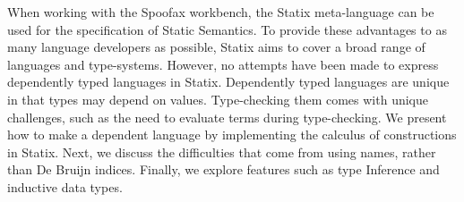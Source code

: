 
When working with the Spoofax workbench, the Statix meta-language can be used for the specification of Static Semantics. To provide these advantages to as many language developers as possible, Statix aims to cover a broad range of languages and type-systems. However, no attempts have been made to express dependently typed languages in Statix. Dependently typed languages are unique in that types may depend on values. Type-checking them comes with unique challenges, such as the need to evaluate terms during type-checking. We present how to make a dependent language by implementing the calculus of constructions in Statix. Next, we discuss the difficulties that come from using names, rather than De Bruijn indices. Finally, we explore features such as type Inference and inductive data types.